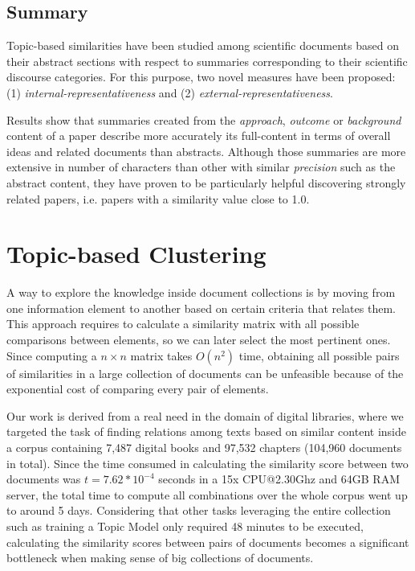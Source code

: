 \subsection{Summary}
Topic-based similarities have been studied among scientific documents based on their abstract sections with respect to summaries corresponding to their scientific discourse categories. For this purpose, two novel measures have been proposed: (1) \textit{internal-representativeness} and (2) \textit{external-representativeness}.

Results show that summaries created from the \textit{approach}, \textit{outcome} or \textit{background} content of a paper describe more accurately its full-content in terms of overall ideas and related documents than abstracts. Although those summaries are more extensive in number of characters than other with similar \textit{precision} such as the abstract content, they have proven to be particularly helpful  discovering strongly related papers, i.e. papers with a similarity value close to 1.0.


\section{Topic-based Clustering}
\label{sec:topic-clustering}

A way to explore the knowledge inside document collections is by moving from one information element to another based on certain criteria that relates them. This approach requires to calculate a similarity matrix with all possible comparisons between elements, so we can later select the most pertinent ones. Since computing a $n \times n$ matrix takes $O(n^2)$ time, obtaining all possible pairs of similarities in a large collection of documents can be unfeasible because of the exponential cost of comparing every pair of elements.

Our work is derived from a real need in the domain of digital libraries, where we targeted the task of finding relations among texts based on similar content inside a corpus containing 7,487 digital books and 97,532 chapters (104,960 documents in total). Since the time consumed in calculating the similarity score between two documents was $t=7.62*10^{-4}$ seconds in a 15x CPU@2.30Ghz and 64GB RAM server, the total time to compute all combinations over the whole corpus went up to around 5 days. Considering that other tasks leveraging the entire collection such as training a Topic Model only required 48 minutes to be executed, calculating the similarity scores between pairs of documents becomes a significant bottleneck when making sense of big collections of documents.

